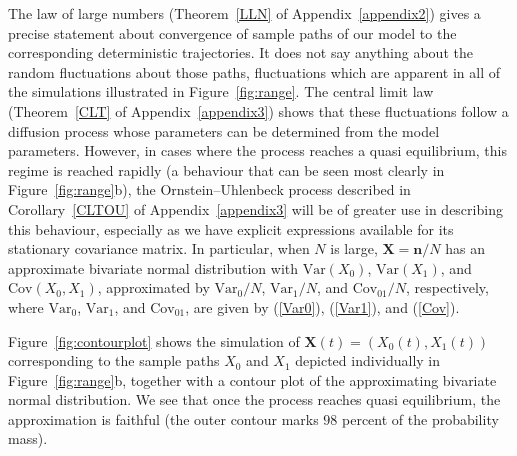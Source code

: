 \documentclass[12pt]{article}
\newcommand{\OU}{Ornstein--Uhlenbeck}
\newcommand{\bn}{\boldsymbol{n}}
\newcommand{\bX}{\boldsymbol{X}}
\newcommand{\Var}{\text{Var}}
\newcommand{\Cov}{\text{Cov}}
\begin{document}
The law of large numbers (Theorem~\ref{LLN} of Appendix~\ref{appendix2})
gives a precise statement about convergence of sample paths of our model
to the corresponding deterministic trajectories. It does not say
anything about the random fluctuations about those paths, fluctuations
which are apparent in all of the simulations illustrated in 
Figure~\ref{fig:range}. The central limit law
(Theorem~\ref{CLT} of Appendix~\ref{appendix3}) shows that these
fluctuations follow a diffusion process whose parameters can be
determined from the model parameters. However, 
in cases where the process reaches a quasi equilibrium, this regime
is reached rapidly (a behaviour that can be seen most clearly in
Figure~\ref{fig:range}b), the {\OU} process described in
Corollary~\ref{CLTOU} of Appendix~\ref{appendix3} will be of greater use
in describing this behaviour, especially as we have explicit expressions
available for its stationary covariance matrix. In particular, when
$N$ is large,
$\bX=\bn/N$ has an approximate bivariate normal distribution with
$\Var(X_0)$, $\Var(X_1)$, and $\Cov(X_0,X_1)$, approximated by
$\Var_0/N$, $\Var_1/N$, and $\Cov_{01}/N$, respectively, where 
$\Var_0$, $\Var_1$, and $\Cov_{01}$, are given by 
(\ref{Var0}), (\ref{Var1}), and (\ref{Cov}).

Figure~\ref{fig:contourplot} shows the simulation of
$\bX(t)=(X_0(t),X_1(t))$ 
corresponding to the sample paths $X_0$ and $X_1$ depicted
individually in Figure~\ref{fig:range}b, together with a contour
plot of the approximating bivariate normal distribution.
We see that once the process reaches quasi equilibrium, the
approximation is faithful (the outer contour marks $98$ percent of the 
probability mass).
\end{document}
